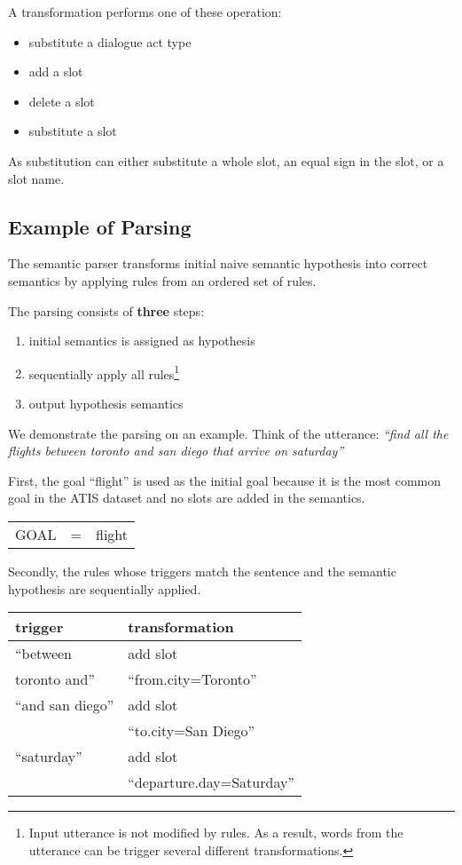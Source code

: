 \documentclass[11pt]{article}
\begin{document}
A transformation performs one of these operation:
\begin{itemize}
  \item substitute a dialogue act type
  \item add a slot
  \item delete a slot
  \item substitute a slot
\end{itemize}
As substitution can either substitute a whole slot, an equal sign in the slot, or a slot name.

\subsection{Example of Parsing} \label{sec:tbl:example}
The semantic parser transforms initial naive semantic hypothesis into correct semantics by applying rules from an ordered set of rules. 

The parsing consists of \textbf{three} steps: 
\begin{enumerate}
  \item initial semantics is assigned as hypothesis
  \item sequentially apply all rules\footnote{Input utterance is not modified by rules. As a result, words from the utterance can be trigger several different transformations.}
  \item output hypothesis semantics
\end{enumerate}

We demonstrate the parsing on an example. Think of the utterance: \textit{``find all the flights between toronto and san diego that arrive on saturday''} 

First, the goal ``flight'' is used as the initial goal because it is the most common goal in the ATIS dataset and no slots are added in the semantics.

\vspace{.25cm}
\begin{tabular}{lll}
  GOAL & = & flight
\end{tabular} 
\vspace{.25cm}

Secondly, the rules whose triggers match the sentence and the semantic hypothesis are sequentially applied.

\vspace{.25cm}
\begin{tabular}{ll}
  trigger & transformation \\
  \hline 
  ``between               & add slot \\
    toronto and''         &``from.city=Toronto'' \\
  ``and san diego''       & add slot \\
                          & ``to.city=San Diego'' \\
  ``saturday''            & add slot \\
                          & ``departure.day=Saturday'' \\
\end{tabular} 
\vspace{.25cm}
\end{document}
